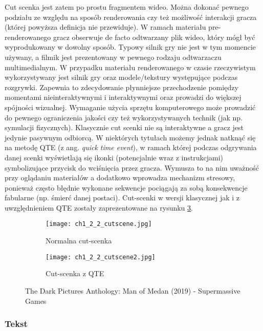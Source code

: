 Cut scenka jest zatem po prostu fragmentem wideo. Można dokonać pewnego podziału ze względu na
sposób renderowania czy też możliwość interakcji gracza (której powyższa definicja nie przewiduje).
W ramach materiału pre-renderowanego gracz obserwuje de facto odtwarzany plik wideo, który mógł
być wyprodukowany w dowolny sposób. Typowy silnik gry nie jest w tym momencie używany, a filmik
jest prezentowany w pewnego rodzaju odtwarzaczu multimedialnym. W przypadku materiału renderowanego
w czasie rzeczywistym wykorzystywany jest silnik gry oraz modele/tekstury występujące podczas
rozgrywki. Zapewnia to zdecydowanie płynniejsze przechodzenie pomiędzy momentami nieinteraktywnymi
i interaktywnymi oraz prowadzi do większej spójności wizualnej. Wymaganie użycia sprzętu komputerowego
może prowadzić do pewnego ograniczenia jakości czy też wykorzystywanych technik (jak np. symulacji
fizycznych). Klasycznie cut scenki nie są interaktywne a gracz jest jedynie pasywnym odbiorcą.
W niektórych tytułach możemy jednak natknąć się na metodę QTE (z ang. \textit{quick time event}), w
ramach której podczas odgrywania danej scenki wyświetlają się ikonki (potencjalnie wraz z instrukcjami)
symbolizujące przycisk do wciśnięcia przez gracza. Wymusza to na nim uważność przy oglądaniu materiałów
a dodatkowo wprowadza mechanizm stresowy, ponieważ często błędnie wykonane sekwencje pociągają
za sobą konsekwencje fabularne (np. śmierć danej postaci). Cut-scenki w wersji klasycznej jak i z
uwzględnieniem QTE zostały zaprezentowane na rysunku \ref{fig:ch1_2_2_cutscene}.

\begin{figure}[h]
	\begin{subfigure}{0.49\textwidth}
		\caption{Normalna cut-scenka}
		\texttt{[image: ch1\_2\_2\_cutscene.jpg]}
		\label{subfig:ch_1_2_2_cutscene1}
	\end{subfigure}
	\begin{subfigure}{0.49\textwidth}
		\caption{Cut-scenka z QTE}
		\texttt{[image: ch1\_2\_2\_cutscene2.jpg]}
		\label{subfig:ch_1_2_2_cutscene2}
	\end{subfigure}
	\caption{The Dark Pictures Anthology: Man of Medan (2019) - Supermassive Games}
	\label{fig:ch1_2_2_cutscene}
\end{figure}

\newpage

\subsubsection*{Tekst}

